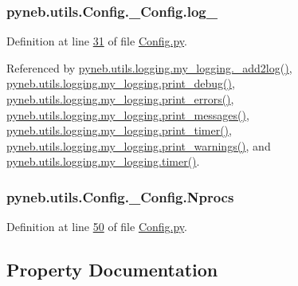 \subsubsection[{log\+\_\+}]{\setlength{\rightskip}{0pt plus 5cm}pyneb.\+utils.\+Config.\+\_\+\+Config.\+log\+\_\+}\label{classpyneb_1_1utils_1_1_config_1_1___config_a8304de6467642234fcf5a7ae1e7a16bd}


Definition at line \hyperlink{_config_8py_source_l00031}{31} of file \hyperlink{_config_8py_source}{Config.\+py}.



Referenced by \hyperlink{logging_8py_source_l00059}{pyneb.\+utils.\+logging.\+my\+\_\+logging.\+\_\+add2log()}, \hyperlink{logging_8py_source_l00157}{pyneb.\+utils.\+logging.\+my\+\_\+logging.\+print\+\_\+debug()}, \hyperlink{logging_8py_source_l00149}{pyneb.\+utils.\+logging.\+my\+\_\+logging.\+print\+\_\+errors()}, \hyperlink{logging_8py_source_l00133}{pyneb.\+utils.\+logging.\+my\+\_\+logging.\+print\+\_\+messages()}, \hyperlink{logging_8py_source_l00165}{pyneb.\+utils.\+logging.\+my\+\_\+logging.\+print\+\_\+timer()}, \hyperlink{logging_8py_source_l00141}{pyneb.\+utils.\+logging.\+my\+\_\+logging.\+print\+\_\+warnings()}, and \hyperlink{logging_8py_source_l00115}{pyneb.\+utils.\+logging.\+my\+\_\+logging.\+timer()}.

\hypertarget{classpyneb_1_1utils_1_1_config_1_1___config_af47651c816db6a79ea1ba34e1594e2d4}{}
\subsubsection[{Nprocs}]{\setlength{\rightskip}{0pt plus 5cm}pyneb.\+utils.\+Config.\+\_\+\+Config.\+Nprocs}\label{classpyneb_1_1utils_1_1_config_1_1___config_af47651c816db6a79ea1ba34e1594e2d4}


Definition at line \hyperlink{_config_8py_source_l00050}{50} of file \hyperlink{_config_8py_source}{Config.\+py}.



\subsection{Property Documentation}
\hypertarget{classpyneb_1_1utils_1_1_config_1_1___config_a5276927da3588ffb009fd79f282c6d3c}{}
